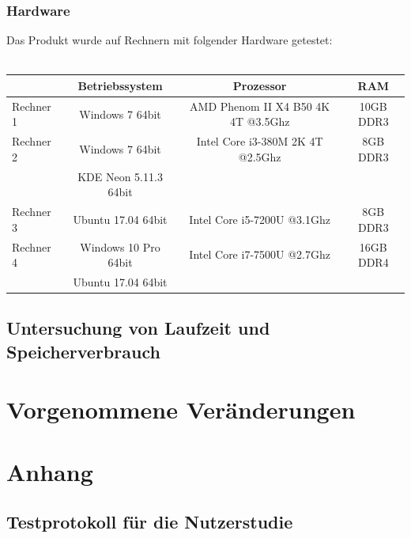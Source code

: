 \documentclass[parskip=full]{scrartcl}
\begin{document}
\subsubsection{Hardware}
Das Produkt wurde auf Rechnern mit folgender Hardware getestet: \\ \\
\begin{tabular}{l||c|c|c}
   	& Betriebssystem & Prozessor & RAM \\
	\hline
	\hline
	Rechner 1 & Windows 7 64bit & AMD Phenom II X4 B50 4K 4T @3.5Ghz & 10GB DDR3 \\
	Rechner 2 & Windows 7 64bit & Intel Core i3-380M 2K 4T @2.5Ghz & 8GB DDR3 \\
	 & KDE Neon 5.11.3 64bit &  \\
	Rechner 3 & Ubuntu 17.04 64bit & Intel Core i5-7200U @3.1Ghz & 8GB DDR3 \\
	Rechner 4 & Windows 10 Pro 64bit & Intel Core i7-7500U @2.7Ghz & 16GB DDR4\\
		& Ubuntu 17.04 64bit\\
\end{tabular}


\subsection{Untersuchung von Laufzeit und Speicherverbrauch}


\section{Vorgenommene Veränderungen}

\section{Anhang}
\subsection{Testprotokoll für die Nutzerstudie}
\end{document}
